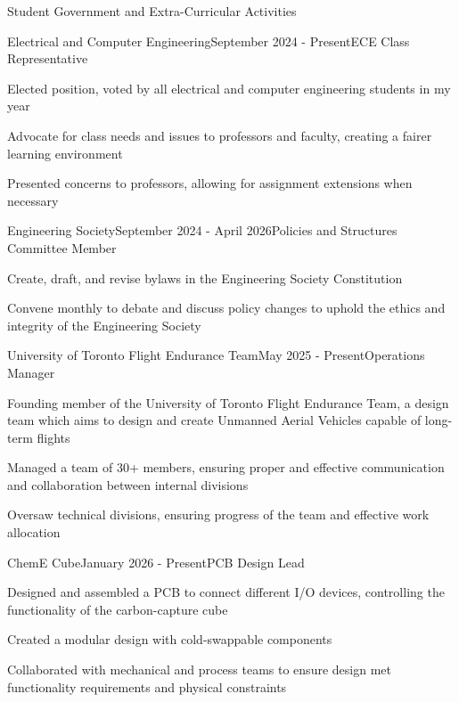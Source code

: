 \documentclass{resume}
\begin{document}
\begin{rSection}{Student Government and Extra-Curricular Activities}

\begin{rSubsection}{Electrical and Computer Engineering}{September 2024 - Present}{ECE Class Representative}{}
\item Elected position, voted by all electrical and computer engineering students in my year
\item Advocate for class needs and issues to professors and faculty, creating a fairer learning environment
\item Presented concerns to professors, allowing for assignment extensions when necessary
\end{rSubsection}


\begin{rSubsection}{Engineering Society}{September 2024 - April 2026}{Policies and Structures Committee Member}{}
\item Create, draft, and revise bylaws in the Engineering Society Constitution
\item Convene monthly to debate and discuss policy changes to uphold the ethics and integrity of the Engineering Society
\end{rSubsection}


\begin{rSubsection}{University of Toronto Flight Endurance Team}{May 2025 - Present}{Operations Manager}{}
\item Founding member of the University of Toronto Flight Endurance Team, a design team which aims to design and create Unmanned Aerial Vehicles capable of long-term flights
\item Managed a team of 30+ members, ensuring proper and effective communication and collaboration between internal divisions
\item Oversaw technical divisions, ensuring progress of the team and effective work allocation
\end{rSubsection}


\begin{rSubsection}{ChemE Cube}{January 2026 - Present}{PCB Design Lead}{}
\item Designed and assembled a PCB to connect different I/O devices, controlling the functionality of the carbon-capture cube
\item Created a modular design with cold-swappable components
\item Collaborated with mechanical and process teams to ensure design met functionality requirements and physical constraints
\end{rSubsection}


\end{rSection}
\end{document}
